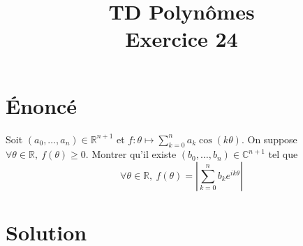 \documentclass[french]{article}
\title{TD Polynômes \\ Exercice 24}
\date{}
\newcommand{\R}{\mathbb{R}}
\newcommand{\C}{\mathbb{C}}
\begin{document}
\maketitle

\section{Énoncé}
Soit $(a_0,\ldots,a_n)\in\R^{n+1}$ et $f:\theta\mapsto\displaystyle\sum_{k=0}^{n}a_k\cos(k\theta)$. On suppose $\forall\theta\in\R,\ f(\theta)\geqslant0$. Montrer qu'il existe $(b_0,\ldots,b_n)\in\C^{n+1}$ tel que $$\forall\theta\in\R,\ f(\theta)=\left\lvert\sum_{k=0}^{n}b_ke^{ik\theta}\right\rvert$$
\section{Solution}
\end{document}
